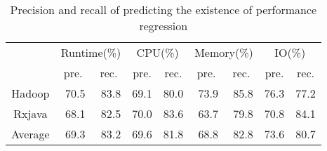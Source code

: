 \begin{table}[]
	\centering
	\footnotesize
	\caption{Precision and recall of predicting the existence of performance regression}
	\label{tab:logistic}
	\begin{tabular}{|c|r|r|r|r|r|r|r|r|}
		\hline
		\multicolumn{1}{|l|}{\multirow{2}{*}{}} & \multicolumn{2}{c|}{Runtime(\%)}                      & \multicolumn{2}{c|}{CPU(\%)}                          & \multicolumn{2}{c|}{Memory(\%)}                       & \multicolumn{2}{c|}{IO(\%)}                           \\ \cline{2-9} 
		\multicolumn{1}{|l|}{}                  & \multicolumn{1}{c|}{pre.} & \multicolumn{1}{c|}{rec.} & \multicolumn{1}{c|}{pre.} & \multicolumn{1}{c|}{rec.} & \multicolumn{1}{c|}{pre.} & \multicolumn{1}{c|}{rec.} & \multicolumn{1}{c|}{pre.} & \multicolumn{1}{c|}{rec.} \\ \hline
		Hadoop                                  & 70.5                      & 83.8                      & 69.1                      & 80.0                      & 73.9                      & 85.8                      & 76.3                      & 77.2                      \\ \hline
		Rxjava                                  & 68.1                      & 82.5                      & 70.0                      & 83.6                      & 63.7                      & 79.8                      & 70.8                      & 84.1                      \\ \hline
		Average                                 & 69.3                      & 83.2                      & 69.6                      & 81.8                      & 68.8                      & 82.8                      & 73.6                      & 80.7                      \\ \hline
	\end{tabular}
\end{table}

